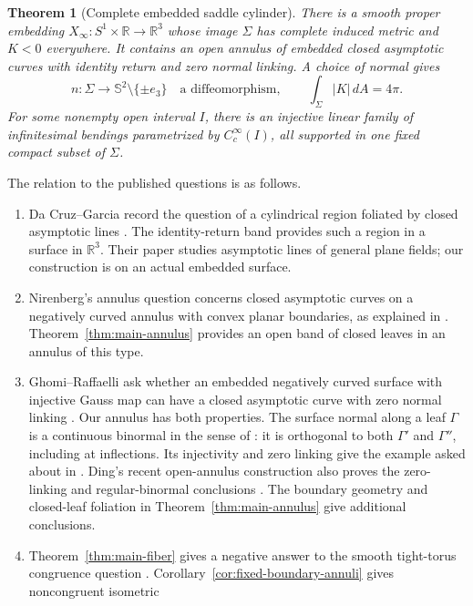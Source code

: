 \documentclass[11pt]{amsart}
\newtheorem{theorem}{Theorem}[section]
\theoremstyle{definition}
\theoremstyle{remark}
\newcommand{\R}{\mathbb R}\newcommand{\Sph}{\mathbb S}
\numberwithin{equation}{section}
\begin{document}
\begin{theorem}[Complete embedded saddle cylinder]\label{thm:complete-cylinder}
There is a smooth proper embedding $X_\infty:S^1\times\R\to\R^3$
whose image $\Sigma$ has complete induced metric and $K<0$ everywhere.
It contains an open annulus of embedded closed asymptotic curves with
identity return and zero normal linking. A choice of normal gives
\[
 n:\Sigma\longrightarrow\Sph^2\setminus\{\pm e_3\}
 \quad\text{a diffeomorphism},\qquad
 \int_\Sigma|K|\,dA=4\pi.
\]
For some nonempty open interval $I$, there is an injective linear family of
infinitesimal bendings parametrized by $C_c^\infty(I)$, all supported in
one fixed compact subset of $\Sigma$.
\end{theorem}

The relation to the published questions is as follows.
\begin{enumerate}[label=\textup{(\roman*)}]
\item Da Cruz--Garcia record the question of a cylindrical region
foliated by closed asymptotic lines \cite[p.~17]{DaCruzGarcia}.
The identity-return band provides such a region in a surface in $\R^3$.
Their paper studies asymptotic lines of general plane fields; our
construction is on an actual embedded surface.
\item Nirenberg's annulus question concerns closed asymptotic curves
on a negatively curved annulus with convex planar boundaries, as
explained in \cite[\S1.2]{GhomiProblems}. Theorem~\ref{thm:main-annulus}
provides an open band of closed leaves in an annulus of this type.
\item Ghomi--Raffaelli ask whether an embedded negatively curved
surface with injective Gauss map can have a closed asymptotic curve
with zero normal linking \cite[Problem~1.1]{GR}. Our annulus has both
properties. The surface normal along a leaf $\Gamma$ is a continuous
binormal in the sense of \cite[\S1.2]{GhomiProblems}: it is orthogonal
to both $\Gamma'$ and $\Gamma''$, including at inflections. Its
injectivity and zero linking give the example asked about in
\cite[Problem~1.4]{GhomiProblems}.
Ding's recent open-annulus construction also proves the zero-linking
and regular-binormal conclusions \cite[Theorem~1.1 and
Corollary~1.2]{Ding2026}. The boundary geometry and closed-leaf
foliation in Theorem~\ref{thm:main-annulus} give additional conclusions.
\item Theorem~\ref{thm:main-fiber} gives a negative answer to the
smooth tight-torus congruence question \cite[Question~11]{BK}.
Corollary~\ref{cor:fixed-boundary-annuli} gives noncongruent isometric

\end{enumerate}
\end{document}
